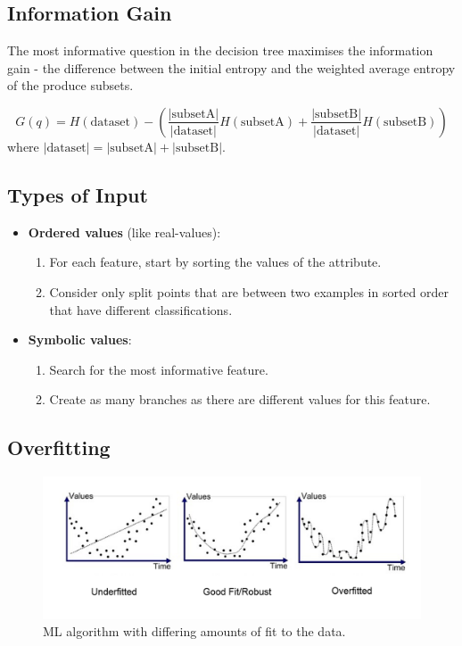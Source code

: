 \documentclass[11pt]{article}
\begin{document}
\subsection{Information Gain}
The most informative question in the decision tree maximises the information gain - the difference between the initial entropy and the weighted average entropy of the produce subsets.

\[
  G(q) = H(\text{dataset}) - \left( \frac{\lvert \text{subsetA} \rvert}{\lvert \text{dataset} \rvert} H(\text{subsetA}) + \frac{\lvert \text{subsetB} \rvert}{\lvert \text{dataset} \rvert} H(\text{subsetB}) \right)
\]
where $\lvert \text{dataset} \rvert  = \lvert \text{subsetA} \rvert + \lvert \text{subsetB} \rvert$.

\subsection{Types of Input}
\begin{itemize}
  \item \textbf{Ordered values} (like real-values):
    \begin{enumerate}
      \item For each feature, start by sorting the values of the attribute.
      \item Consider only split points that are between two examples in sorted order that have different classifications.
    \end{enumerate}
  \item \textbf{Symbolic values}:
    \begin{enumerate}
      \item Search for the most informative feature.
      \item Create as many branches as there are different values for this feature.
    \end{enumerate}
\end{itemize}

\subsection{Overfitting}
\begin{figure}[htb!]
  \centering
  \caption{ML algorithm with differing amounts of fit to the data.}
  \includegraphics[scale=0.3]{overfitted}
\end{figure}
\end{document}
